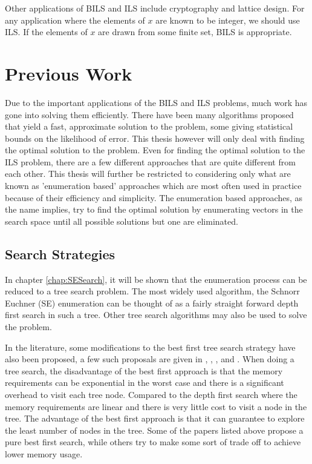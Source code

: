 \documentclass[12pt,Bold,letterpaper]{mcgilletdclass}
\begin{document}
Other applications of BILS and ILS include cryptography and lattice design. For any application where the elements of $x$
are known to be integer, we should use ILS. If the elements of $x$ are drawn from some finite set, BILS is appropriate.

\section{Previous Work} \label{sec:prevWork}
Due to the important applications of the BILS and ILS problems, much work has gone into solving them efficiently. There have been many algorithms proposed that yield a fast, approximate solution to the problem, some giving statistical bounds on the likelihood of error. This thesis however will only deal with finding the optimal solution to the problem.  Even for finding the optimal solution to the ILS problem, there are a few different approaches that are quite different from each other. This thesis will further be restricted to considering only what are known as 'enumeration based' approaches which are most often used in practice because of their efficiency and simplicity. The enumeration based approaches, as the name implies, try to find the optimal solution by enumerating vectors in the search space until all possible solutions but one are eliminated.

\subsection{Search Strategies}
In chapter \ref{chap:SESearch}, it will be shown that the enumeration process can be reduced to a tree search problem. The most widely used algorithm, the Schnorr Euchner (SE) enumeration \cite{SchE94} can be thought of as a fairly straight forward depth first search in such a tree. Other tree search algorithms may also be used to solve the problem.

In the literature, some modifications to the best first tree search strategy have also been proposed, a few such proposals are given in \cite{MurGDC06}, \cite{XuWZW04}, \cite{FukMU04}, \cite{StuBF07} and \cite{DaiY08}. When doing a tree search, the disadvantage of the best first approach is that the memory requirements can be exponential in the worst case and there is a significant overhead to visit each tree node. Compared to the depth first search where the memory requirements are linear and there is very little cost to visit a node in the tree. The advantage of the best first approach is that it can guarantee to explore the least number of nodes in the tree. Some of the papers listed above propose a pure best first search, while others try to make some sort of trade off to achieve lower memory usage.
\end{document}
